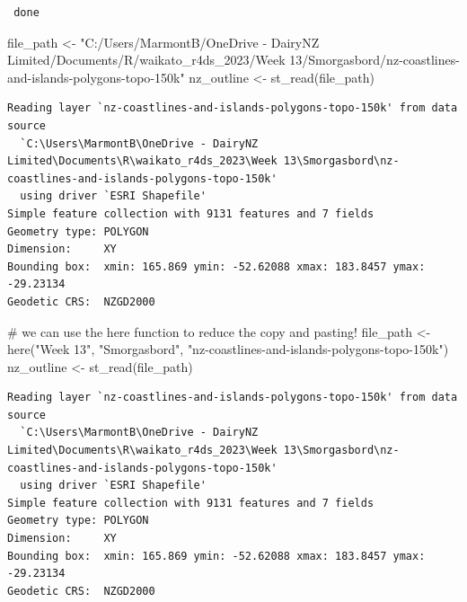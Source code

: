 \documentclass[
  letterpaper,
  DIV=11,
  numbers=noendperiod]{scrartcl}
\newenvironment{Shaded}{\begin{snugshade}}{\end{snugshade}}
\newcommand{\CommentTok}[1]{\textcolor[rgb]{0.37,0.37,0.37}{#1}}
\newcommand{\FunctionTok}[1]{\textcolor[rgb]{0.28,0.35,0.67}{#1}}
\newcommand{\NormalTok}[1]{\textcolor[rgb]{0.00,0.23,0.31}{#1}}
\newcommand{\OtherTok}[1]{\textcolor[rgb]{0.00,0.23,0.31}{#1}}
\newcommand{\StringTok}[1]{\textcolor[rgb]{0.13,0.47,0.30}{#1}}
\begin{document}
\begin{verbatim}
 done
\end{verbatim}

\begin{Shaded}
\begin{Highlighting}[]
\NormalTok{file\_path }\OtherTok{\textless{}{-}} \StringTok{"C:/Users/MarmontB/OneDrive {-} DairyNZ Limited/Documents/R/waikato\_r4ds\_2023/Week 13/Smorgasbord/nz{-}coastlines{-}and{-}islands{-}polygons{-}topo{-}150k"}
\NormalTok{nz\_outline }\OtherTok{\textless{}{-}} \FunctionTok{st\_read}\NormalTok{(file\_path)}
\end{Highlighting}
\end{Shaded}

\begin{verbatim}
Reading layer `nz-coastlines-and-islands-polygons-topo-150k' from data source 
  `C:\Users\MarmontB\OneDrive - DairyNZ Limited\Documents\R\waikato_r4ds_2023\Week 13\Smorgasbord\nz-coastlines-and-islands-polygons-topo-150k' 
  using driver `ESRI Shapefile'
Simple feature collection with 9131 features and 7 fields
Geometry type: POLYGON
Dimension:     XY
Bounding box:  xmin: 165.869 ymin: -52.62088 xmax: 183.8457 ymax: -29.23134
Geodetic CRS:  NZGD2000
\end{verbatim}

\begin{Shaded}
\begin{Highlighting}[]
\CommentTok{\# we can use the here function to reduce the copy and pasting!}
\NormalTok{file\_path }\OtherTok{\textless{}{-}} \FunctionTok{here}\NormalTok{(}\StringTok{"Week 13"}\NormalTok{, }\StringTok{"Smorgasbord"}\NormalTok{, }\StringTok{"nz{-}coastlines{-}and{-}islands{-}polygons{-}topo{-}150k"}\NormalTok{)}
\NormalTok{nz\_outline }\OtherTok{\textless{}{-}} \FunctionTok{st\_read}\NormalTok{(file\_path)}
\end{Highlighting}
\end{Shaded}

\begin{verbatim}
Reading layer `nz-coastlines-and-islands-polygons-topo-150k' from data source 
  `C:\Users\MarmontB\OneDrive - DairyNZ Limited\Documents\R\waikato_r4ds_2023\Week 13\Smorgasbord\nz-coastlines-and-islands-polygons-topo-150k' 
  using driver `ESRI Shapefile'
Simple feature collection with 9131 features and 7 fields
Geometry type: POLYGON
Dimension:     XY
Bounding box:  xmin: 165.869 ymin: -52.62088 xmax: 183.8457 ymax: -29.23134
Geodetic CRS:  NZGD2000
\end{verbatim}
\end{document}
